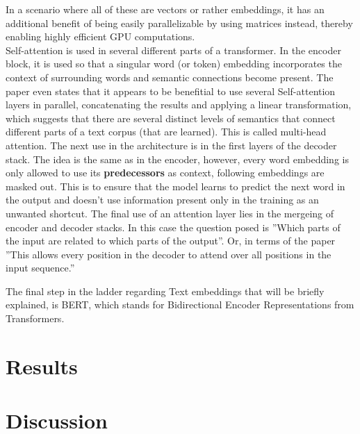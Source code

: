 \documentclass[draft,final]{vutinfth} %
\begin{document}
In a scenario where all of these are vectors or rather embeddings, it has an additional benefit of being easily parallelizable by using matrices instead, thereby enabling highly efficient GPU computations.\\
Self-attention is used in several different parts of a transformer. In the encoder block, it is used so that a singular word (or token) embedding incorporates the context of surrounding words and semantic connections become present. The paper even states that it appears to be benefitial to use several Self-attention layers in parallel, concatenating the results and applying a linear transformation, which suggests that there are several distinct levels of semantics that connect different parts of a text corpus (that are learned). This is called multi-head attention. The next use in the architecture is in the first layers of the decoder stack. The idea is the same as in the encoder, however, every word embedding is only allowed to use its \textbf{predecessors} as context, following embeddings are masked out. This is to ensure that the model learns to predict the next word in the output and doesn't use information present only in the training as an unwanted shortcut. The final use of an attention layer lies in the mergeing of encoder and decoder stacks. In this case  the question posed is ''Which parts of the input are related to which parts of the output''. Or, in terms of the paper ''This allows every position in the decoder to attend over all positions in the input sequence.'' \cite[p. 5]{vaswani_attention_2017}

The final step in the ladder regarding Text embeddings that will be briefly explained, is BERT, which stands for Bidirectional Encoder Representations from Transformers. 

\chapter{Results}


\chapter{Discussion}


\backmatter

\begin{aitools}
\end{aitools}
\end{document}
